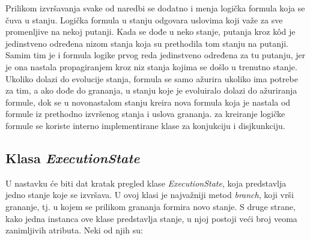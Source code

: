\documentclass[12pt,oneside]{memoir}
\begin{document}
Prilikom izvršavanja svake od naredbi se dodatno i menja logička formula koja se čuva u stanju. Logička formula u stanju odgovara uslovima koji važe za sve promenljive na nekoj putanji. Kada se dođe u neko stanje, putanja kroz k\^od je jedinstveno određena nizom stanja koja su prethodila tom stanju na putanji. Samim tim je i formula logike prvog reda jedinstveno određena za tu putanju, jer je ona nastala propagiranjem kroz niz stanja kojima se došlo u trenutno stanje. Ukoliko dolazi do evolucije stanja, formula se samo ažurira ukoliko ima potrebe za tim, a ako dođe do grananja, u stanju koje je evoluiralo dolazi do ažuriranja formule, dok se u novonastalom stanju kreira nova formula koja je nastala od formule iz prethodno izvršenog stanja i uslova grananja. za kreiranje logičke formule se koriste interno implementirane klase za konjukciju i disjkunkciju.   
    
\subsection{Klasa \textit{ExecutionState}}
U nastavku će biti dat kratak pregled klase \textit{ExecutionState}, koja predstavlja jedno stanje koje se izvršava. U ovoj klasi je najvažniji metod \textit{branch}, koji vrši grananje, tj. u kojem se prilikom grananja formira novo stanje. S druge strane, kako jedna instanca ove klase predstavlja stanje, u njoj postoji veći broj veoma zanimljivih atributa. Neki od njih su:
\end{document}
